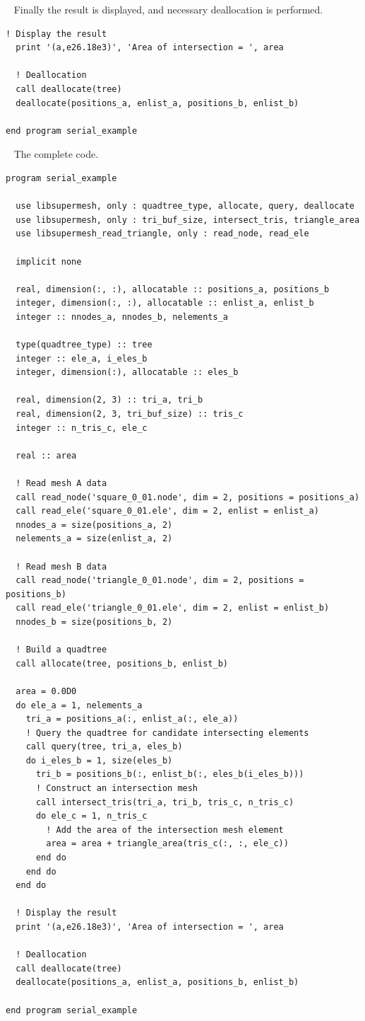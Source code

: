 \documentclass{article}
\begin{document}
~\newline
Finally the result is displayed, and necessary deallocation is performed.
\begin{lstlisting}[language=FORTRAN]    
  ! Display the result
  print '(a,e26.18e3)', 'Area of intersection = ', area
  
  ! Deallocation
  call deallocate(tree)
  deallocate(positions_a, enlist_a, positions_b, enlist_b)
  
end program serial_example
\end{lstlisting}

~\newline
The complete code.
\begin{lstlisting}[language=FORTRAN]
program serial_example

  use libsupermesh, only : quadtree_type, allocate, query, deallocate
  use libsupermesh, only : tri_buf_size, intersect_tris, triangle_area
  use libsupermesh_read_triangle, only : read_node, read_ele

  implicit none
  
  real, dimension(:, :), allocatable :: positions_a, positions_b
  integer, dimension(:, :), allocatable :: enlist_a, enlist_b
  integer :: nnodes_a, nnodes_b, nelements_a
  
  type(quadtree_type) :: tree
  integer :: ele_a, i_eles_b
  integer, dimension(:), allocatable :: eles_b
  
  real, dimension(2, 3) :: tri_a, tri_b
  real, dimension(2, 3, tri_buf_size) :: tris_c
  integer :: n_tris_c, ele_c
  
  real :: area
  
  ! Read mesh A data
  call read_node('square_0_01.node', dim = 2, positions = positions_a)
  call read_ele('square_0_01.ele', dim = 2, enlist = enlist_a)
  nnodes_a = size(positions_a, 2)
  nelements_a = size(enlist_a, 2)
  
  ! Read mesh B data
  call read_node('triangle_0_01.node', dim = 2, positions = positions_b)
  call read_ele('triangle_0_01.ele', dim = 2, enlist = enlist_b)
  nnodes_b = size(positions_b, 2)
  
  ! Build a quadtree
  call allocate(tree, positions_b, enlist_b)
  
  area = 0.0D0
  do ele_a = 1, nelements_a
    tri_a = positions_a(:, enlist_a(:, ele_a))
    ! Query the quadtree for candidate intersecting elements
    call query(tree, tri_a, eles_b)
    do i_eles_b = 1, size(eles_b)
      tri_b = positions_b(:, enlist_b(:, eles_b(i_eles_b)))
      ! Construct an intersection mesh
      call intersect_tris(tri_a, tri_b, tris_c, n_tris_c)
      do ele_c = 1, n_tris_c
        ! Add the area of the intersection mesh element
        area = area + triangle_area(tris_c(:, :, ele_c))
      end do
    end do
  end do
  
  ! Display the result
  print '(a,e26.18e3)', 'Area of intersection = ', area
  
  ! Deallocation
  call deallocate(tree)
  deallocate(positions_a, enlist_a, positions_b, enlist_b)
  
end program serial_example
\end{lstlisting}
\end{document}
